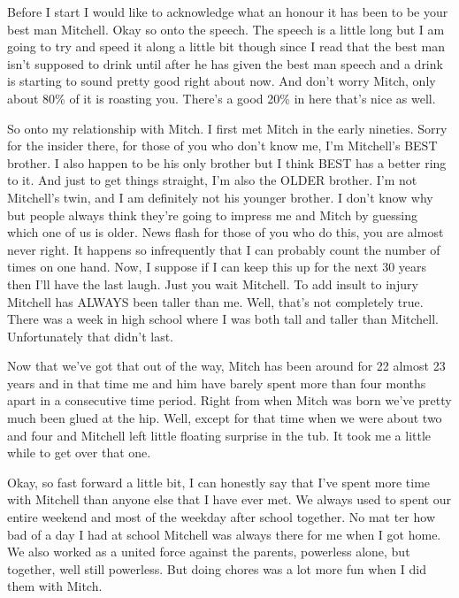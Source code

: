 Before I start I would like to acknowledge what an honour it has been to be your best man Mitchell. Okay so onto the speech. The speech is a little long but I am going to try and speed it along a little bit though since I read that the best man isn't supposed to drink until after he has given the best man speech and a drink is starting to sound pretty good right about now. And don't worry Mitch, only about 80\% of it is roasting you. There's a good 20\% in here that's nice as well.

So onto my relationship with Mitch. I first met Mitch in the early nineties. Sorry for the insider there, for those of you who don't know me, I’m Mitchell’s BEST brother. I also happen to be his only brother but I think BEST has a better ring to it. And just to get things straight, I'm also the OLDER brother. I’m not Mitchell’s twin, and I am definitely not his younger brother. I don't know why but people always think they're going to impress me and Mitch by guessing which one of us is older. News flash for those of you who do this, you are almost never right. It happens so infrequently that I can probably count the number of times on one hand. Now, I suppose if I can keep this up for the next 30 years then I'll have the last laugh. Just you wait Mitchell. To add insult to injury Mitchell has ALWAYS been taller than me. Well, that's not completely true. There was a week in high school where I was both tall and taller than Mitchell. Unfortunately that didn't last.

Now that we've got that out of the way, Mitch has been around for 22 almost 23 years and in that time me and him have barely spent more than four months apart in a consecutive time period.
Right from when Mitch was born we've pretty much been glued at the hip. Well, except for that time when we were about two and four and Mitchell left little floating surprise in the tub. It took me a little while to get over that one.

Okay, so fast forward a little bit, I can honestly say that I've spent more time with Mitchell than anyone else that I have ever met. We always used to spent our entire weekend and most of the weekday after school together. No mat
ter how bad of a day I had at school Mitchell was always there for me when I got home. We also worked as a united force against the parents, powerless alone, but together, well still powerless. But doing chores was a lot more fun when I did them with Mitch.

